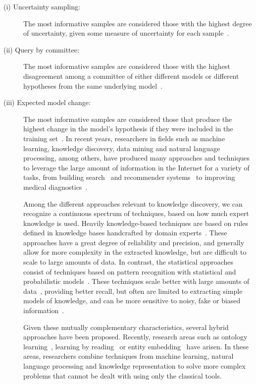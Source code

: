 \begin{description}
\item[(i) Uncertainty sampling:] The most informative samples are considered those with the highest degree of uncertainty, given some measure of uncertainty for each sample~\cite{Lewis1994148}.

\item[(ii) Query by committee:] The most informative samples are considered those with the highest disagreement among a committee of either different models or different hypotheses from the same underlying model~\cite{seungquery}.

\item[(iii) Expected model change:] The most informative samples are considered those that produce the highest change in the model's hypothesis if they were included in the training set~\cite{NIPS2007_3252}.
In recent years, researchers in fields such as machine learning, knowledge discovery, data mining and
natural language processing, among others, have produced many approaches and techniques to
leverage the large amount of information in the Internet for a variety of tasks, from
building search~\cite{google} and recommender systems~\cite{youtube}
to improving medical diagnostics~\cite{watson}.

Among the different approaches relevant to knowledge discovery, we can recognize a
continuous spectrum of techniques, based on how much expert knowledge is used.
Heavily knowledge-based techniques are based
on rules defined in knowledge bases handcrafted by domain experts~\cite{chandrasekaran1986generic}.
These approaches have a great degree
of reliability and precision, and generally allow for more complexity in the extracted knowledge,
but are difficult to scale to large amounts of data.
In contrast, the statistical approaches consist of techniques based on pattern recognition with statistical
and probabilistic models~\cite{kevin2012machine}. These techniques scale better with large amounts of data~\cite{le2013building},
providing better recall, but often are limited to extracting simple models of knowledge,
and can be more sensitive to noisy, fake or biased information~\cite{bolukbasi2016man}.

Given these mutually complementary characteristics, several hybrid approaches have been proposed.
Recently, research areas such as ontology learning~\cite{cimiano2009ontology},
learning by reading~\cite{barker2007learning} or entity embedding~\cite{hu2015entity} have arisen.
In these areas, researchers combine techniques from machine learning, natural language
processing and knowledge representation to solve more complex problems that cannot
be dealt with using only the classical tools.


\end{description}
